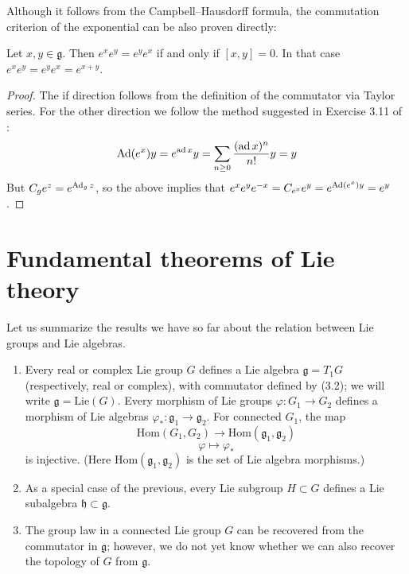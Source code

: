 \documentclass{report}
\begin{document}
Although it follows from the Campbell--Hausdorff formula, the commutation criterion of the exponential can be also proven directly:
\begin{theorem}
    Let $x, y \in \mathfrak g$.
    Then $e^x e^y = e^y e^x$ if and only if $[x,y]=0$.
    In that case $e^x e^y = e^y e^x = e^{x+y}$.
\end{theorem}
\begin{proof}
    The if direction follows from the definition of the commutator via Taylor series.
    For the other direction we follow the method suggested in Exercise 3.11 of \cite{kirillov2008introduction}:
    \[
    \operatorname{Ad}(e^x)y = e^{\operatorname{ad} x} y = \sum_{n\geq 0} \frac{(\operatorname{ad} x)^n}{n!} y = y
    \]
    But $C_g e^z = e^{\operatorname{Ad}_g z}$, so the above implies that $e^x e^y e^{-x} = C_{e^x}e^y = e^{\operatorname{Ad}(e^x)y} = e^y$.
\end{proof}

\section{Fundamental theorems of Lie theory}
Let us summarize the results we have so far about the relation between Lie
groups and Lie algebras.

\begin{enumerate}
    \item Every real or complex Lie group $G$ defines a Lie algebra $\mathfrak{g} = T_1 G$ (respectively, real or complex), with commutator defined by (3.2); we will write $\mathfrak{g} = \text{Lie}(G)$. Every morphism of Lie groups $\varphi : G_1 \to G_2$ defines a morphism of Lie algebras $\varphi_* : \mathfrak{g}_1 \to \mathfrak{g}_2$. For connected $G_1$, the map
    \[
    \text{Hom}(G_1, G_2) \to \text{Hom}(\mathfrak{g}_1, \mathfrak{g}_2)
    \]
    \[
    \varphi \mapsto \varphi_*
    \]
    is injective. (Here $\text{Hom}(\mathfrak{g}_1, \mathfrak{g}_2)$ is the set of Lie algebra morphisms.)
    \item As a special case of the previous, every Lie subgroup $H \subset G$ defines a Lie subalgebra $\mathfrak{h} \subset \mathfrak{g}$.
    \item The group law in a connected Lie group $G$ can be recovered from the commutator in $\mathfrak{g}$; however, we do not yet know whether we can also recover the topology of $G$ from $\mathfrak{g}$.
\end{enumerate}
\end{document}
